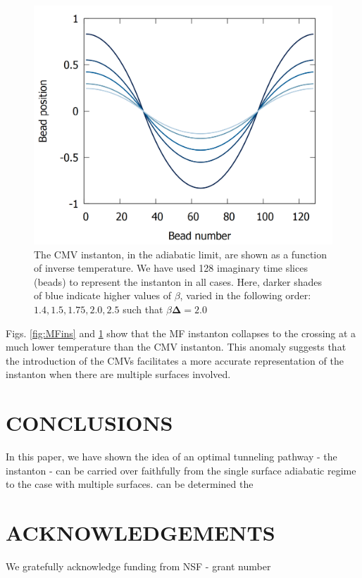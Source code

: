 \documentclass[%
 aip,
 jmp,%
 amsmath,amssymb,
reprint,%
]{revtex4-1}
\begin{document}
\begin{figure}[htb!]
\centering
\includegraphics[scale=0.16]{MVadia-instanton-lines.png}
\caption{The CMV instanton, in the adiabatic limit, are shown as a function of inverse temperature. We have used 128 imaginary time slices (beads) to represent the instanton in all cases. Here, darker shades of blue indicate higher values of $\beta$, varied in the following order: $1.4, 1.5, 1.75, 2.0, 2.5$ such that $\beta\mathbf{\Delta}=2.0$ } \label{fig:CMVins}
\end{figure}
Figs. \ref{fig:MFins} and \ref{fig:CMVins} show that the MF instanton collapses to the crossing at a much lower temperature than the CMV instanton. This anomaly suggests that the introduction of the CMVs facilitates a more accurate representation of the instanton when there are multiple surfaces involved. 



\section{\label{sec:level6}CONCLUSIONS}
In this paper, we have shown the idea of an optimal tunneling pathway - the instanton - can be carried over faithfully from the single surface adiabatic regime to the case with multiple surfaces.  can be determined the 

\section*{ACKNOWLEDGEMENTS}
We gratefully acknowledge funding from NSF - grant number 
\end{document}
